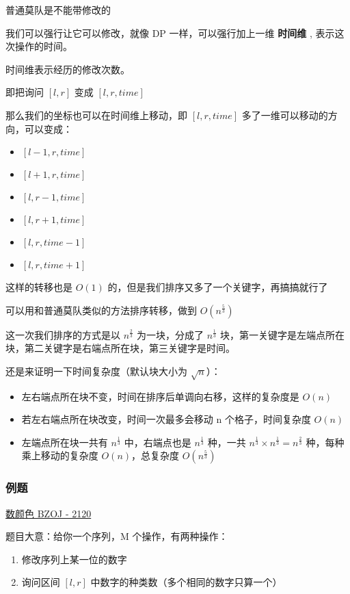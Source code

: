 普通莫队是不能带修改的

我们可以强行让它可以修改，就像 DP 一样，可以强行加上一维 \textbf{ 时间维 }, 表示这次操作的时间。

时间维表示经历的修改次数。

即把询问 $[l,r]$ 变成 $[l,r,time]$

那么我们的坐标也可以在时间维上移动，即 $[l,r,time]$ 多了一维可以移动的方向，可以变成：

\begin{itemize}
\item $[l-1,r,time]$
\item $[l+1,r,time]$
\item $[l,r-1,time]$
\item $[l,r+1,time]$
\item $[l,r,time-1]$
\item $[l,r,time+1]$
\end{itemize}

这样的转移也是 $O(1)$ 的，但是我们排序又多了一个关键字，再搞搞就行了

可以用和普通莫队类似的方法排序转移，做到 $O(n^{\frac{5}{3}})$

这一次我们排序的方式是以 $n^{\frac{2}{3}}$ 为一块，分成了 $n^{\frac{1}{3}}$ 块，第一关键字是左端点所在块，第二关键字是右端点所在块，第三关键字是时间。

还是来证明一下时间复杂度（默认块大小为 $\sqrt{n}$）：

\begin{itemize}
\item 左右端点所在块不变，时间在排序后单调向右移，这样的复杂度是 $O(n)$
\item 若左右端点所在块改变，时间一次最多会移动 n 个格子，时间复杂度 $O(n)$
\item 左端点所在块一共有 $n^{\frac{1}{3}}$ 中，右端点也是 $n^{\frac{1}{3}}$ 种，一共 ${n^{\frac{1}{3}}}\times{n^{\frac{1}{3}}}=n^{\frac{2}{3}}$ 种，每种乘上移动的复杂度 $O(n)$，总复杂度 $O(n^{\frac{5}{3}})$
\end{itemize}

\subsubsection{例题}

\href{https://www.lydsy.com/JudgeOnline/problem.php?id=2120}{数颜色 BZOJ - 2120}

题目大意：给你一个序列，M 个操作，有两种操作：

\begin{enumerate}
\item 修改序列上某一位的数字
\item 询问区间 $[l,r]$ 中数字的种类数（多个相同的数字只算一个）
\end{enumerate}

